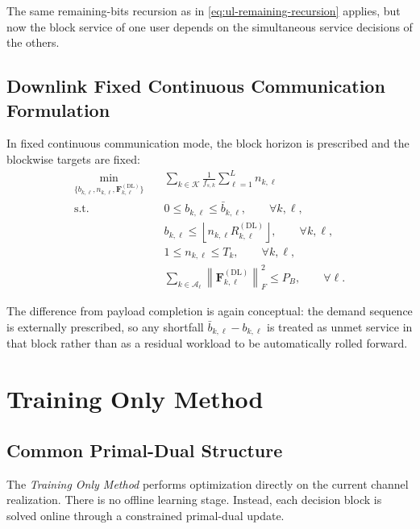 \documentclass[11pt]{article}
\newcommand{\Kset}{\mathcal{K}}
\newcommand{\Aset}{\mathcal{A}}
\newcommand{\F}{\mathbf{F}}
\newcommand{\norm}[1]{\left\lVert #1 \right\rVert}
\newcommand{\floor}[1]{\left\lfloor #1 \right\rfloor}
\newcommand{\DL}{\mathrm{DL}}
\begin{document}
The same remaining-bits recursion as in
\eqref{eq:ul-remaining-recursion} applies, but now the block service of one
user depends on the simultaneous service decisions of the others.

\subsection{Downlink Fixed Continuous Communication Formulation}

In fixed continuous communication mode, the block horizon is prescribed and the
blockwise targets are fixed:
\begin{subequations}
\begin{align}
\min_{\{b_{k,\ell},n_{k,\ell},\F_{k,\ell}^{(\DL)}\}}
\quad
&
\sum_{k\in\Kset}\frac{1}{f_{s,k}}\sum_{\ell=1}^{L} n_{k,\ell}
\label{eq:dl-fixed-obj}
\\
\text{s.t.}\quad
&
0 \le b_{k,\ell} \le \bar b_{k,\ell},
\qquad \forall k,\ell,
\label{eq:dl-fixed-target}
\\
&
b_{k,\ell}
\le
\floor{n_{k,\ell}R_{k,\ell}^{(\DL)}},
\qquad \forall k,\ell,
\label{eq:dl-fixed-fbl}
\\
&
1 \le n_{k,\ell} \le T_k,
\qquad \forall k,\ell,
\label{eq:dl-fixed-n}
\\
&
\sum_{k\in\Aset_\ell}\norm{\F_{k,\ell}^{(\DL)}}_F^2 \le P_B,
\qquad \forall \ell.
\label{eq:dl-fixed-power}
\end{align}
\end{subequations}

The difference from payload completion is again conceptual: the demand sequence
is externally prescribed, so any shortfall
$\bar b_{k,\ell}-b_{k,\ell}$ is treated as unmet service in that block rather
than as a residual workload to be automatically rolled forward.

\section{Training Only Method}

\subsection{Common Primal-Dual Structure}

The \emph{Training Only Method} performs optimization directly on the current
channel realization. There is no offline learning stage. Instead, each decision
block is solved online through a constrained primal-dual update.
\end{document}
